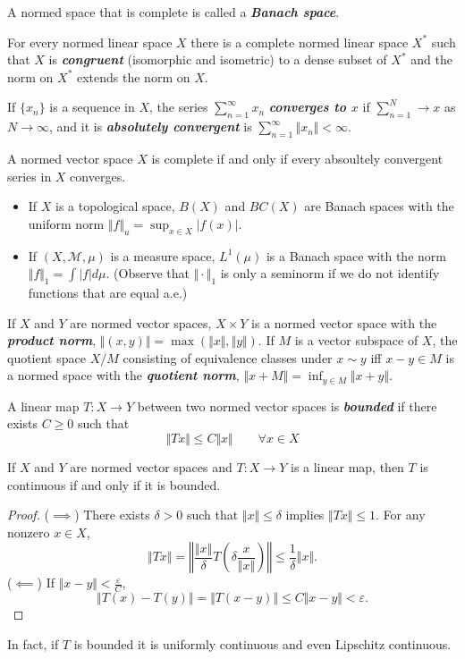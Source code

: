 \documentclass{article}
\theoremstyle{definition}
\numberwithin{equation}{section}
\begin{document}
A normed space that is complete is called a \textbf{\textit{Banach space}}.
\begin{thm}
	For every normed linear space $X$ there is a complete normed linear space $X^*$ such that $X$ is \textbf{\textit{congruent}} (isomorphic and isometric) to a dense subset of $X^*$ and the norm on $X^*$ extends the norm on $X$.
\end{thm}
If $\{x_n\}$ is a sequence in $X$, the series $\sum_{n=1}^\infty x_n$ \textbf{\textit{converges to $x$}} if $\sum_{n=1}^N\to x$ as $N\to \infty$, and it is \textbf{\textit{absolutely convergent}} is $\sum_{n=1}^\infty\Vert x_n\Vert<\infty$.
\begin{thm}
	A normed vector space $X$ is complete if and only if every absoultely convergent series in $X$ converges.
\end{thm}

\begin{examples}\leavevmode
	\begin{itemize}
		\item If $X$ is a topological space, $B(X)$ and $BC(X)$ are Banach spaces with the uniform norm $\Vert f\Vert_u=\sup_{x\in X}|f(x)|$.
		\item If $(X,\mathcal{M},\mu)$ is a measure space, $L^1(\mu)$ is a Banach space with the norm $\Vert f\Vert_1=\int|f|d\mu$. (Observe that $\Vert\cdot\Vert_1$ is only a seminorm if we do not identify functions that are equal a.e.)
	\end{itemize}
\end{examples}
If $X$ and $Y$ are normed vector spaces, $X\times Y$ is a normed vector space with the \textbf{\textit{product norm}}, $\Vert(x,y)\Vert=\max(\Vert x\Vert,\Vert y\Vert)$.  If $M$ is a vector subspace of $X$, the quotient space $X/M$ consisting of equivalence classes under $x\sim y$ iff $x-y\in M$ is a normed space with the \textbf{\textit{quotient norm}}, $\Vert x+M\Vert=\inf_{y\in M}\Vert x+y\Vert$.

A linear map $T:X\to Y$ between two normed vector spaces is \textbf{\textit{bounded}} if there exists $C\geq0$ such that
\[\Vert Tx\Vert\leq C\Vert x\Vert\qquad \forall x\in X\]
\begin{prop}
	If $X$ and $Y$ are normed vector spaces and $T:X\to Y$ is a linear map, then $T$ is continuous if and only if it is bounded.
\end{prop}
\begin{proof}
	($\implies $) There exists $\delta>0$ such that $\Vert x\Vert\leq\delta$ implies $\Vert Tx\Vert\leq1$. For any nonzero $x\in X$,
	\[\Vert Tx\Vert=\left\Vert \frac{\Vert x\Vert}{\delta}T\left(\delta\frac{x}{\Vert x\Vert}\right)\right\Vert\leq\frac{1}{\delta} \Vert x\Vert.\]
	($\impliedby$) If $\Vert x-y\Vert<\frac{\varepsilon}{C}$,
	\[\Vert T(x)-T(y)\Vert=\Vert T(x-y)\Vert\leq C\Vert x-y\Vert<\varepsilon.\]
\end{proof}
In fact, if $T$ is bounded it is uniformly continuous and even Lipschitz continuous.
\end{document}
